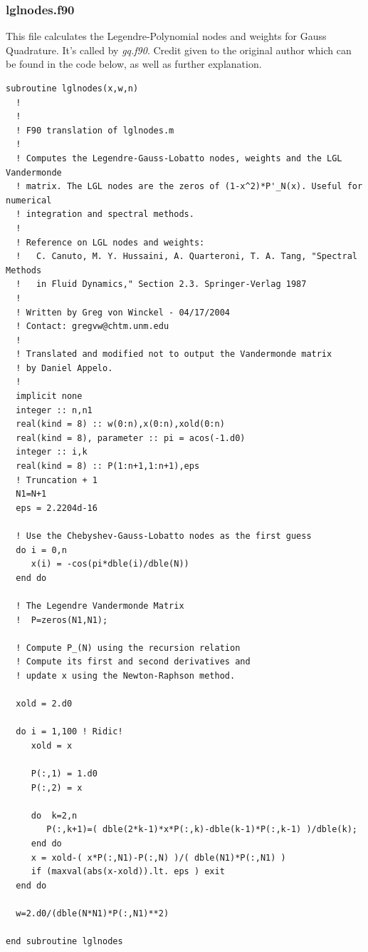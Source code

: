 \documentclass[12pt]{article}
\begin{document}
\subsubsection{lglnodes.f90} \label{lgl_code}
This file calculates the Legendre-Polynomial nodes and weights for Gauss Quadrature.
It's called by \emph{gq.f90}. Credit given to the original author which can be found in the
code below, as well as further explanation. 

\begin{verbatim}
subroutine lglnodes(x,w,n)
  !
  ! 
  ! F90 translation of lglnodes.m
  !
  ! Computes the Legendre-Gauss-Lobatto nodes, weights and the LGL Vandermonde 
  ! matrix. The LGL nodes are the zeros of (1-x^2)*P'_N(x). Useful for numerical
  ! integration and spectral methods. 
  !
  ! Reference on LGL nodes and weights:  
  !   C. Canuto, M. Y. Hussaini, A. Quarteroni, T. A. Tang, "Spectral Methods
  !   in Fluid Dynamics," Section 2.3. Springer-Verlag 1987
  !
  ! Written by Greg von Winckel - 04/17/2004
  ! Contact: gregvw@chtm.unm.edu
  !
  ! Translated and modified not to output the Vandermonde matrix 
  ! by Daniel Appelo.  
  !
  implicit none
  integer :: n,n1
  real(kind = 8) :: w(0:n),x(0:n),xold(0:n)
  real(kind = 8), parameter :: pi = acos(-1.d0)
  integer :: i,k
  real(kind = 8) :: P(1:n+1,1:n+1),eps
  ! Truncation + 1
  N1=N+1
  eps = 2.2204d-16
  
  ! Use the Chebyshev-Gauss-Lobatto nodes as the first guess
  do i = 0,n
     x(i) = -cos(pi*dble(i)/dble(N))
  end do
  
  ! The Legendre Vandermonde Matrix
  !  P=zeros(N1,N1);
  
  ! Compute P_(N) using the recursion relation
  ! Compute its first and second derivatives and 
  ! update x using the Newton-Raphson method.
  
  xold = 2.d0
  
  do i = 1,100 ! Ridic!   
     xold = x
     
     P(:,1) = 1.d0
     P(:,2) = x
     
     do  k=2,n
        P(:,k+1)=( dble(2*k-1)*x*P(:,k)-dble(k-1)*P(:,k-1) )/dble(k);
     end do
     x = xold-( x*P(:,N1)-P(:,N) )/( dble(N1)*P(:,N1) )
     if (maxval(abs(x-xold)).lt. eps ) exit
  end do
  
  w=2.d0/(dble(N*N1)*P(:,N1)**2)
 
end subroutine lglnodes

\end{verbatim}
\end{document}
